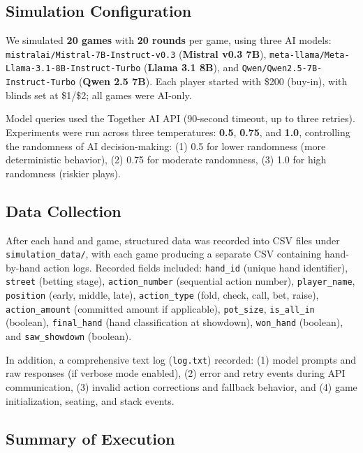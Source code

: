 \documentclass{article}
\begin{document}
\subsection{Simulation Configuration}

We simulated \textbf{20 games} with \textbf{20 rounds} per game, using three AI models: \texttt{mistralai/Mistral-7B-Instruct-v0.3} (\textbf{Mistral v0.3 7B}), \texttt{meta-llama/Meta-Llama-3.1-8B-Instruct-Turbo} (\textbf{Llama 3.1 8B}), and \texttt{Qwen/Qwen2.5-7B-Instruct-Turbo} (\textbf{Qwen 2.5 7B}). Each player started with \$200 (buy-in), with blinds set at \$1/\$2; all games were AI-only.

Model queries used the Together AI API (90-second timeout, up to three retries). Experiments were run across three temperatures: \textbf{0.5}, \textbf{0.75}, and \textbf{1.0}, controlling the randomness of AI decision-making: (1) 0.5 for lower randomness (more deterministic behavior), (2) 0.75 for moderate randomness, (3) 1.0 for high randomness (riskier plays).

\subsection{Data Collection}

After each hand and game, structured data was recorded into CSV files under \texttt{simulation\_data/}, with each game producing a separate CSV containing hand-by-hand action logs. Recorded fields included: \texttt{hand\_id} (unique hand identifier), \texttt{street} (betting stage), \texttt{action\_number} (sequential action number), \texttt{player\_name}, \texttt{position} (early, middle, late), \texttt{action\_type} (fold, check, call, bet, raise), \texttt{action\_amount} (committed amount if applicable), \texttt{pot\_size}, \texttt{is\_all\_in} (boolean), \texttt{final\_hand} (hand classification at showdown), \texttt{won\_hand} (boolean), and \texttt{saw\_showdown} (boolean).

In addition, a comprehensive text log (\texttt{log.txt}) recorded: (1) model prompts and raw responses (if verbose mode enabled), (2) error and retry events during API communication, (3) invalid action corrections and fallback behavior, and (4) game initialization, seating, and stack events.

\subsection{Summary of Execution}
\end{document}
